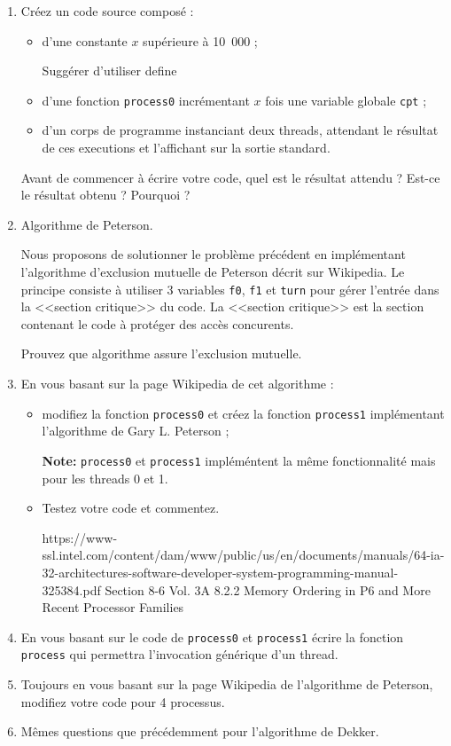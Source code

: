 \documentclass[11pt]{article}
\begin{document}
\begin{enumerate}
 \item Créez un code source composé :
 \begin{itemize}
  \item d'une constante $x$ supérieure à 10~000 ;
\begin{solution}
 Suggérer d'utiliser define
\end{solution}
  \item d'une fonction \texttt{process0} incrémentant $x$ fois une variable globale \texttt{cpt} ;
  \item d'un corps de programme instanciant deux threads, attendant le résultat de ces executions et l'affichant sur la sortie standard.
 \end{itemize}
 Avant de commencer à écrire votre code, quel est le résultat attendu ? Est-ce le résultat obtenu ? Pourquoi ?

 \item Algorithme de Peterson.

 Nous proposons de solutionner le problème précédent en implémentant l'algorithme d'exclusion mutuelle de Peterson décrit sur Wikipedia.
 Le principe consiste à utiliser 3 variables \texttt{f0}, \texttt{f1} et \texttt{turn} pour gérer l'entrée dans la <<section critique>> du code.
 La <<section critique>> est la section contenant le code à protéger des accès concurents.

 Prouvez que algorithme assure l'exclusion mutuelle.

 \item En vous basant sur la page Wikipedia de cet algorithme :
 \begin{itemize}
  \item modifiez la fonction \texttt{process0} et créez la fonction \texttt{process1} implémentant l'algorithme de Gary L. Peterson ;

\textbf{Note:}  \texttt{process0}  et  \texttt{process1} impléméntent la même fonctionnalité mais pour les threads 0 et 1.
  \item Testez votre code et commentez.
  \begin{solution}
    https://www-ssl.intel.com/content/dam/www/public/us/en/documents/manuals/64-ia-32-architectures-software-developer-system-programming-manual-325384.pdf Section 8-6 Vol. 3A 8.2.2 Memory Ordering in P6 and More Recent Processor Families
  \end{solution}
 \end{itemize}

 \item En vous basant sur le code de \texttt{process0} et \texttt{process1} écrire la fonction \texttt{process} qui permettra l'invocation générique d'un thread.

 \item Toujours en vous basant sur la page Wikipedia de l'algorithme de Peterson, modifiez votre code pour 4 processus.

 \item Mêmes questions que précédemment pour l'algorithme de Dekker.

\end{enumerate}
\end{document}

